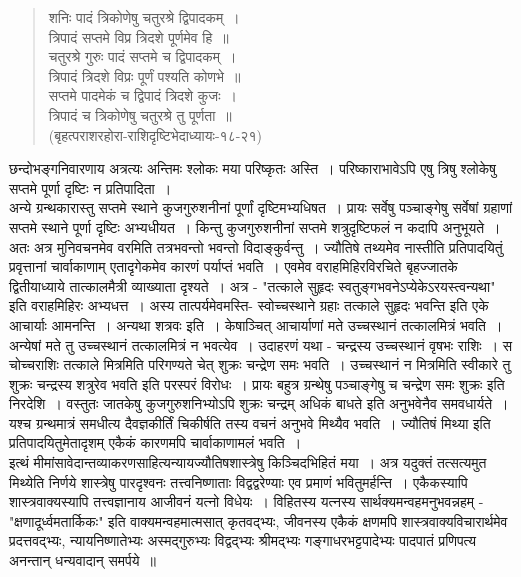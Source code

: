 {\begin{verse}
शनिः पादं त्रिकोणेषु चतुरश्रे द्विपादकम्~। \\
त्रिपादं सप्तमे विप्र त्रिदशे पूर्णमेव हि~॥\\
चतुरश्रे गुरुः पादं सप्तमे च द्विपादकम्~। \\
त्रिपादं त्रिदशे विप्रः पूर्णं पश्यति कोणभे~॥\\
सप्तमे पादमेकं च द्विपादं त्रिदशे कुजः~। \\
त्रिपादं च त्रिकोणेषु चतुरश्रे तु पूर्णता~॥\\
\hspace{3cm} (बृहत्पराशरहोरा-राशिदृष्टिभेदाध्यायः-१८-२१)
\end{verse}
छन्दोभङ्गनिवारणाय अत्रत्यः अन्तिमः श्लोकः मया परिष्कृतः अस्ति~। परिष्काराभावेऽपि एषु त्रिषु श्लोकेषु सप्तमे पूर्णा दृष्टिः न प्रतिपादिता~।  
~\\[0.2cm]
अन्ये ग्रन्थकारास्तु सप्तमे स्थाने कुजगुरुशनीनां पूर्णां दृष्टिमभ्यधिषत~। प्रायः सर्वेषु पञ्चाङ्गेषु सर्वेषां ग्रहाणां सप्तमे स्थाने पूर्णा दृष्टिः अभ्यधीयत~। किन्तु कुजगुरुशनीनां सप्तमे शत्रुदृष्टिफलं न कदापि अनुभूयते~। अतः अत्र मुनिवचनमेव वरमिति तत्रभवन्तो भवन्तो विदाङ्कुर्वन्तु~। ज्यौतिषे तथ्यमेव नास्तीति प्रतिपादयितुं प्रवृत्तानां चार्वाकाणाम् एतादृगेकमेव कारणं पर्याप्तं भवति~। एवमेव वराहमिहिरविरचिते बृहज्जातके द्वितीयाध्याये तात्कालमैत्री व्याख्याता दृश्यते~। अत्र - "तत्काले सुहृदः स्वतुङ्गभवनेऽप्येकेऽरयस्त्वन्यथा" इति वराहमिहिरः अभ्यधत्त~। अस्य तात्पर्यमेवमस्ति- स्वोच्चस्थाने ग्रहाः तत्काले  सुहृदः भवन्ति इति एके आचार्याः आमनन्ति~। अन्यथा शत्रवः इति~। केषाञ्चित् आचार्याणां मते उच्चस्थानं तत्कालमित्रं भवति~। अन्येषां मते तु उच्चस्थानं तत्कालमित्रं न भवत्येव~। उदाहरणं यथा - चन्द्रस्य उच्चस्थानं वृषभः राशिः~। स चोच्चराशिः तत्काले मित्रमिति परिगण्यते चेत् शुक्रः चन्द्रेण समः भवति~। उच्चस्थानं न मित्रमिति स्वीकारे तु शुक्रः चन्द्रस्य शत्रुरेव भवति इति परस्परं विरोधः~। प्रायः बहुत्र ग्रन्थेषु पञ्चाङ्गेषु च चन्द्रेण समः शुक्रः इति निरदेशि~। वस्तुतः जातकेषु कुजगुरुशनिभ्योऽपि शुक्रः चन्द्रम् अधिकं बाधते इति अनुभवेनैव समवधार्यते~। यश्च ग्रन्थमात्रं समधीत्य दैवज्ञकीर्तिं चिकीर्षति तस्य वचनं अनुभवे मिथ्यैव भवति~। ज्यौतिषं मिथ्या इति प्रतिपादयितुमेतादृशम् एकैकं कारणमपि चार्वाकाणामलं भवति~। 
~\\[0.2cm]
इत्थं मीमांसावेदान्तव्याकरणसाहित्यन्यायज्यौतिषशास्त्रेषु किञ्चिदभिहितं मया~। अत्र यदुक्तं तत्सत्यमुत मिथ्येति निर्णये शास्त्रेषु पारदृश्वनः तत्त्वनिष्णाताः विद्वद्वरेण्याः एव प्रमाणं भवितुमर्हन्ति~। एकैकस्यापि शास्त्रवाक्यस्यापि तत्त्वज्ञानाय आजीवनं यत्नो विधेयः~। विहितस्य यत्नस्य सार्थक्यमन्वहमनुभवन्नहम् - "क्षणादूर्ध्वमतार्किकः" इति वाक्यमन्वहमात्मसात् कृतवद्भ्यः, जीवनस्य एकैकं क्षणमपि शास्त्रवाक्यविचारार्थमेव प्रदत्तवद्भ्यः, न्यायनिष्णातेभ्यः अस्मद्गुरुभ्यः विद्वद्भ्यः श्रीमद्भ्यः गङ्गाधरभट्टपादेभ्यः पादपातं प्रणिपत्य अनन्तान् धन्यवादान् समर्पये~॥
					
\articleend
}
